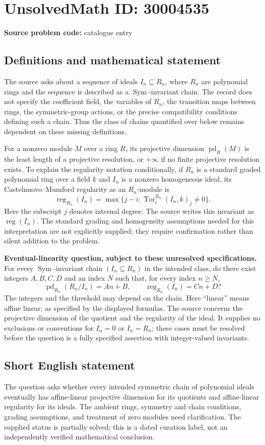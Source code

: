 \documentclass[11pt]{article}
\begin{document}
\section*{UnsolvedMath ID: 30004535}
\textbf{Source problem code:} catalogue entry
\subsection{Definitions and mathematical statement}
The source asks about a sequence of ideals \(I_n\subseteq R_n\), where \(R_n\) are polynomial rings and the sequence is described as a \(\operatorname{Sym}\)-invariant chain. The record does not specify the coefficient field, the variables of \(R_n\), the transition maps between rings, the symmetric-group actions, or the precise compatibility conditions defining such a chain. Thus the class of chains quantified over below remains dependent on these missing definitions.

For a nonzero module \(M\) over a ring \(R\), its projective dimension \(\operatorname{pd}_R(M)\) is the least length of a projective resolution, or \(+\infty\) if no finite projective resolution exists. To explain the regularity notation conditionally, if \(R_n\) is a standard graded polynomial ring over a field \(k\) and \(I_n\) is a nonzero homogeneous ideal, its Castelnuovo--Mumford regularity as an \(R_n\)-module is
\[
\operatorname{reg}_{R_n}(I_n)
=\max\{j-i:\operatorname{Tor}^{R_n}_i(I_n,k)_j\ne 0\}.
\]
Here the subscript \(j\) denotes internal degree. The source writes this invariant as \(\operatorname{reg}(I_n)\). The standard grading and homogeneity assumptions needed for this interpretation are not explicitly supplied; they require confirmation rather than silent addition to the problem.

\textbf{Eventual-linearity question, subject to these unresolved specifications.} For every \(\operatorname{Sym}\)-invariant chain \((I_n\subseteq R_n)\) in the intended class, do there exist integers \(A,B,C,D\) and an index \(N\) such that, for every index \(n\ge N\),
\[
\operatorname{pd}_{R_n}(R_n/I_n)=An+B,
\qquad
\operatorname{reg}_{R_n}(I_n)=Cn+D?
\]
The integers and the threshold may depend on the chain. Here ``linear'' means affine linear, as specified by the displayed formulas. The source concerns the projective dimension of the quotient and the regularity of the ideal. It supplies no exclusions or conventions for \(I_n=0\) or \(I_n=R_n\); these cases must be resolved before the question is a fully specified assertion with integer-valued invariants.
\subsection{Short English statement}
The question asks whether every intended symmetric chain of polynomial ideals eventually has affine-linear projective dimension for its quotients and affine-linear regularity for its ideals. The ambient rings, symmetry and chain conditions, grading assumptions, and treatment of zero modules need clarification. The supplied status is partially solved; this is a dated curation label, not an independently verified mathematical conclusion.
\end{document}
